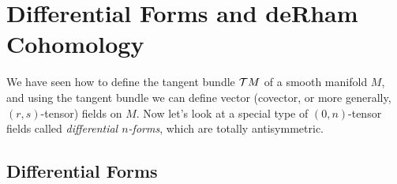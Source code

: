 
\section{Differential Forms and deRham Cohomology}

We have seen how to define the tangent bundle \(\mathcal T M\) of a smooth manifold \(M\), and using the tangent bundle we can define vector (covector, or more generally, \((r, s)\)-tensor) fields on \(M\). Now let's look at a special type of \((0, n)\)-tensor fields called \emph{differential \(n\)-forms}, which are totally antisymmetric.

\subsection{Differential Forms}

